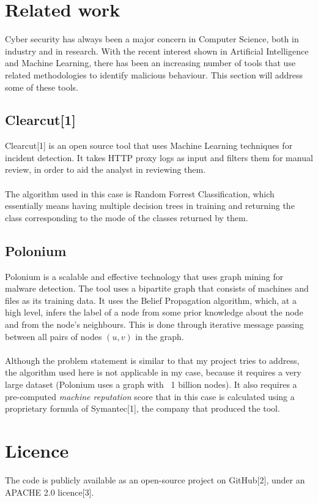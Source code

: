 \documentclass[12pt,a4paper,twoside,openright]{report}
\begin{document}
\section{Related work}
Cyber security has always been a major concern in Computer Science, both in industry and in research. With the recent interest shown in Artificial Intelligence and Machine Learning, there has been an increasing number of tools that use related methodologies to identify malicious behaviour. This section will address some of these tools. 

\subsection{Clearcut[1]}
Clearcut[1] is an open source tool that uses Machine Learning techniques for incident detection. It takes HTTP proxy logs as input and filters them for manual review, in order to aid the analyst in reviewing them. 
\\ \\ 
The algorithm used in this case is Random Forrest Classification, which essentially means having multiple decision trees in training and returning the class corresponding to the mode of the classes returned by them. 


\subsection{Polonium}
Polonium is a scalable and effective technology that uses graph mining for malware detection. The tool uses a bipartite graph that consists of machines and files as its training data. It uses the Belief Propagation algorithm, which, at a high level, infers the label of a node from some prior knowledge about the node and from the node's neighbours. This is done through iterative message passing between all pairs of nodes $(u, v)$ in the graph. 
\\ \\
Although the problem statement is similar to that my project tries to address, the algorithm used here is not applicable in my case, because it requires a very large dataset (Polonium uses a graph with ~1 billion nodes). It also requires a pre-computed \textit{machine reputation} score that in this case is calculated using a proprietary formula of Symantec[1], the company that produced the tool. 


\section{Licence} 
The code is publicly available as an open-source project on GitHub[2], under an APACHE 2.0 licence[3]. 


\end{document}
